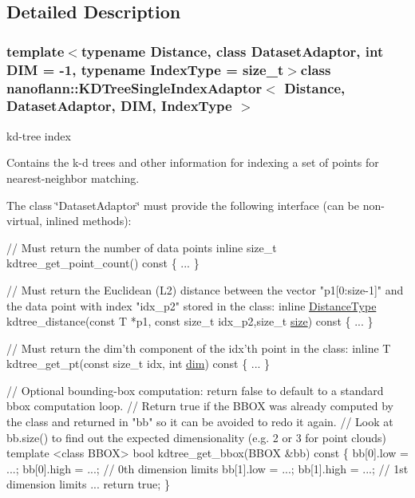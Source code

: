 \subsection{Detailed Description}
\subsubsection*{template$<$typename Distance, class Dataset\-Adaptor, int D\-I\-M = -\/1, typename Index\-Type = size\-\_\-t$>$class nanoflann\-::\-K\-D\-Tree\-Single\-Index\-Adaptor$<$ Distance, Dataset\-Adaptor, D\-I\-M, Index\-Type $>$}

kd-\/tree index

Contains the k-\/d trees and other information for indexing a set of points for nearest-\/neighbor matching.

The class \char`\"{}\-Dataset\-Adaptor\char`\"{} must provide the following interface (can be non-\/virtual, inlined methods)\-:


\begin{DoxyCode}
\textcolor{comment}{// Must return the number of data points}
\textcolor{keyword}{inline} \textcolor{keywordtype}{size\_t} kdtree\_get\_point\_count()\textcolor{keyword}{ const }\{ ... \}

\textcolor{comment}{// Must return the Euclidean (L2) distance between the vector "p1[0:size-1]" and the data point with index
       "idx\_p2" stored in the class:}
\textcolor{keyword}{inline} \hyperlink{classnanoflann_1_1_k_d_tree_single_index_adaptor_addc764e7c19cc85c89b3903338e5a910}{DistanceType} kdtree\_distance(\textcolor{keyword}{const} T *p1, \textcolor{keyword}{const} \textcolor{keywordtype}{size\_t} idx\_p2,\textcolor{keywordtype}{size\_t} 
      \hyperlink{classnanoflann_1_1_k_d_tree_single_index_adaptor_a197f7417c238e35ad36738c450696155}{size})\textcolor{keyword}{ const }\{ ... \}

\textcolor{comment}{// Must return the dim'th component of the idx'th point in the class:}
\textcolor{keyword}{inline} T kdtree\_get\_pt(\textcolor{keyword}{const} \textcolor{keywordtype}{size\_t} idx, \textcolor{keywordtype}{int} \hyperlink{classnanoflann_1_1_k_d_tree_single_index_adaptor_a1b818d32a7f9c58bee114a25e3539969}{dim})\textcolor{keyword}{ const }\{ ... \}

\textcolor{comment}{// Optional bounding-box computation: return false to default to a standard bbox computation loop.}
\textcolor{comment}{//   Return true if the BBOX was already computed by the class and returned in "bb" so it can be avoided to
       redo it again.}
\textcolor{comment}{//   Look at bb.size() to find out the expected dimensionality (e.g. 2 or 3 for point clouds)}
\textcolor{keyword}{template} <\textcolor{keyword}{class} BBOX>
\textcolor{keywordtype}{bool} kdtree\_get\_bbox(BBOX &bb)\textcolor{keyword}{ const}
\textcolor{keyword}{}\{
   bb[0].low = ...; bb[0].high = ...;  \textcolor{comment}{// 0th dimension limits}
   bb[1].low = ...; bb[1].high = ...;  \textcolor{comment}{// 1st dimension limits}
   ...
   \textcolor{keywordflow}{return} \textcolor{keyword}{true};
\}
\end{DoxyCode}



